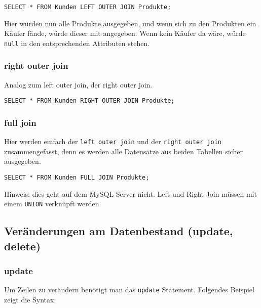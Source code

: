 
\begin{lstlisting}[caption={Left Join SQL}]
SELECT * FROM Kunden LEFT OUTER JOIN Produkte;
\end{lstlisting}

Hier würden nun alle Produkte ausgegeben, und wenn sich zu den Produkten ein Käufer fände, würde dieser mit angegeben. Wenn kein Käufer da wäre, würde \texttt{null} in den entsprechenden Attributen stehen.

\subsubsection{right outer join}
Analog zum left outer join, der right outer join.


\begin{lstlisting}[caption={Right Join SQL}]
SELECT * FROM Kunden RIGHT OUTER JOIN Produkte;
\end{lstlisting}

\subsubsection{full join}
Hier werden einfach der \texttt{left outer join} und der \texttt{right outer join} zusammengefasst, denn es werden alle Datensätze aus beiden Tabellen sicher ausgegeben.


\begin{lstlisting}[caption={Full Join SQL}]
SELECT * FROM Kunden FULL JOIN Produkte;
\end{lstlisting}

Hinweis: dies geht auf dem MySQL Server nicht. Left und Right Join müssen mit einem \texttt{UNION} verknüpft werden.

\subsection{Veränderungen am Datenbestand (update, delete)}

\subsubsection{update}
Um Zeilen zu verändern benötigt man das \texttt{update} Statement. Folgendes Beispiel zeigt die Syntax:

